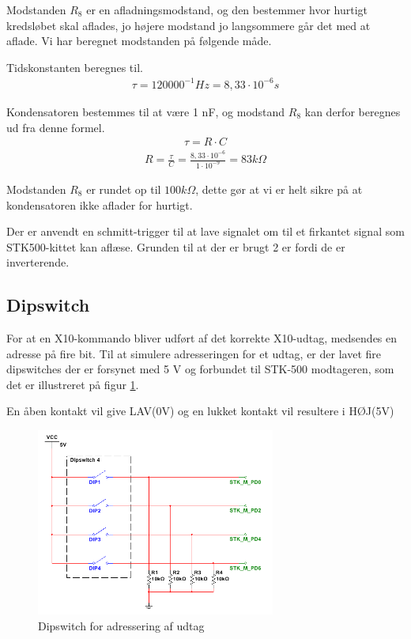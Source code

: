 Modstanden $R_8$ er en afladningsmodstand, og den bestemmer hvor hurtigt kredsløbet skal aflades, jo højere modstand jo langsommere går det med at aflade. Vi har beregnet modstanden på følgende måde.

Tidskonstanten beregnes til.
\begin{align}
\tau = 120000^{-1} Hz = 8,33 \cdot 10^{-6} s
\end{align}


Kondensatoren bestemmes til at være 1 nF, og modstand $R_8$ kan derfor beregnes ud fra denne formel.
\begin{align}
\tau = R \cdot C 
\end{align}
\begin{align}
R = \frac{\tau}{C} = \frac{8,33 \cdot 10^{-6}}{1 \cdot 10^{-9}} = 83 k\Omega
\end{align}

Modstanden $R_8$ er rundet op til $100 k\Omega$, dette gør at vi er helt sikre på at kondensatoren ikke aflader for hurtigt. 

Der er anvendt en schmitt-trigger til at lave signalet om til et firkantet signal som STK500-kittet kan aflæse. Grunden til at der er brugt 2 er fordi de er inverterende. 

\newpage
\subsection{Dipswitch}
For at en X10-kommando bliver udført af det korrekte X10-udtag, medsendes en adresse på fire bit.
Til at simulere adresseringen for et udtag, er der lavet fire dipswitches der er forsynet med 5 V og forbundet til STK-500 modtageren, som det er illustreret på figur \ref{fig:DIPSWITCH}.

En åben kontakt vil give LAV(0V) og en lukket kontakt vil resultere i HØJ(5V)

\begin{figure}[htbp]
	\centering
	\includegraphics[width=0.70\textwidth]{billeder/HWdesign/DIPSWITCH}
	\caption{Dipswitch for adressering af udtag}
	\label{fig:DIPSWITCH}
\end{figure}

